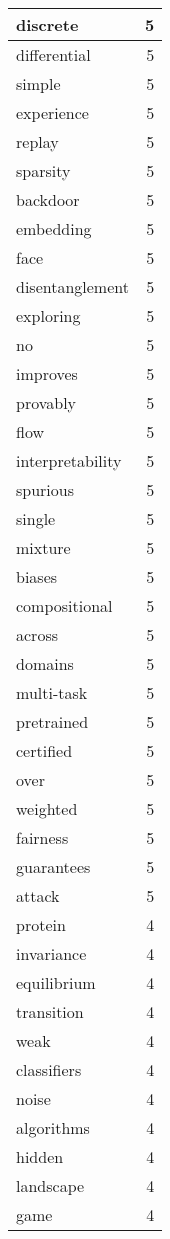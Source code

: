 \begin{table}[h]
\begin{tabular}{|l|r|}
\hline
discrete & 5 \\
\hline
differential & 5 \\
\hline
simple & 5 \\
\hline
experience & 5 \\
\hline
replay & 5 \\
\hline
sparsity & 5 \\
\hline
backdoor & 5 \\
\hline
embedding & 5 \\
\hline
face & 5 \\
\hline
disentanglement & 5 \\
\hline
exploring & 5 \\
\hline
no & 5 \\
\hline
improves & 5 \\
\hline
provably & 5 \\
\hline
flow & 5 \\
\hline
interpretability & 5 \\
\hline
spurious & 5 \\
\hline
single & 5 \\
\hline
mixture & 5 \\
\hline
biases & 5 \\
\hline
compositional & 5 \\
\hline
across & 5 \\
\hline
domains & 5 \\
\hline
multi-task & 5 \\
\hline
pretrained & 5 \\
\hline
certified & 5 \\
\hline
over & 5 \\
\hline
weighted & 5 \\
\hline
fairness & 5 \\
\hline
guarantees & 5 \\
\hline
attack & 5 \\
\hline
protein & 4 \\
\hline
invariance & 4 \\
\hline
equilibrium & 4 \\
\hline
transition & 4 \\
\hline
weak & 4 \\
\hline
classifiers & 4 \\
\hline
noise & 4 \\
\hline
algorithms & 4 \\
\hline
hidden & 4 \\
\hline
landscape & 4 \\
\hline
game & 4 \\

\end{tabular}
\end{table}

